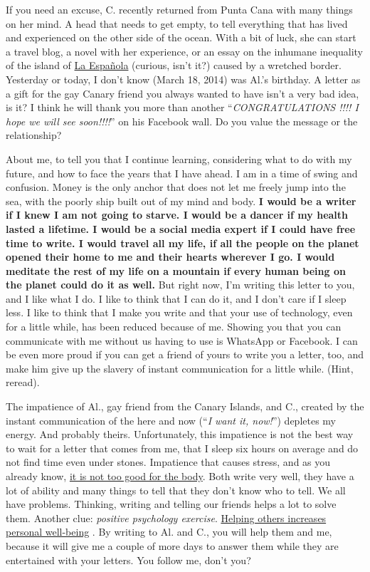 \documentclass[]{book}
\begin{document}
If you need an excuse, C. recently returned from Punta Cana with many things on her mind. A head that needs to get empty, to tell everything that has lived and experienced on the other side of the ocean. With a bit of luck, she can start a travel blog, a novel with her experience, or an essay on the inhumane inequality of the island of \href{https://en.wikipedia.org/wiki/Hispaniola}{La Española} (curious, isn't it?) caused by a wretched border. Yesterday or today, I don't know (March 18, 2014) was Al.'s birthday. A letter as a gift for the gay Canary friend you always wanted to have isn't a very bad idea, is it? I think he will thank you more than another ``\emph{CONGRATULATIONS !!!! I hope we will see soon!!!!}'' on his Facebook wall. Do you value the message or the relationship?

About me, to tell you that I continue learning, considering what to do with my future, and how to face the years that I have ahead. I am in a time of swing and confusion. Money is the only anchor that does not let me freely jump into the sea, with the poorly ship built out of my mind and body. \textbf{I would be a writer if I knew I am not going to starve. I would be a dancer if my health lasted a lifetime. I would be a social media expert if I could have free time to write. I would travel all my life, if all the people on the planet opened their home to me and their hearts wherever I go. I would meditate the rest of my life on a mountain if every human being on the planet could do it as well.} But right now, I'm writing this letter to you, and I like what I do. I like to think that I can do it, and I don't care if I sleep less. I like to think that I make you write and that your use of technology, even for a little while, has been reduced because of me. Showing you that you can communicate with me without us having to use is WhatsApp or Facebook. I can be even more proud if you can get a friend of yours to write you a letter, too, and make him give up the slavery of instant communication for a little while. (Hint, reread).

The impatience of Al., gay friend from the Canary Islands, and C., created by the instant communication of the here and now (``\emph{I want it, now!}'') depletes my energy. And probably theirs. Unfortunately, this impatience is not the best way to wait for a letter that comes from me, that I sleep six hours on average and do not find time even under stones. Impatience that causes stress, and as you already know, \href{https://en.wikipedia.org/wiki/Psychological_stress\#Physical_effects}{it is not too good for the body}. Both write very well, they have a lot of ability and many things to tell that they don't know who to tell. We all have problems. Thinking, writing and telling our friends helps a lot to solve them. Another clue: \emph{positive psychology exercise}. \href{https://en.wikipedia.org/wiki/Prosocial_behavior\#Relation_to_mood_and_emotion}{Helping others increases personal well-being} \citep{passmore2015positive}. By writing to Al. and C., you will help them and me, because it will give me a couple of more days to answer them while they are entertained with your letters. You follow me, don't you?
\end{document}

